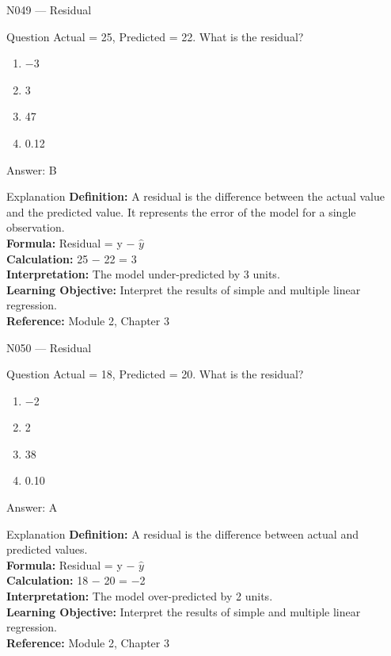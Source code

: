 \documentclass[aspectratio=169,8pt]{beamer}
\begin{document}
	\begin{frame}{N049 --- Residual}
		\begin{block}{Question}
			Actual = 25, Predicted = 22. What is the residual?
			\begin{enumerate}
				\item $-$3
				\item 3
				\item 47
				\item 0.12
			\end{enumerate}
		\end{block}
		\begin{exampleblock}{Answer: B}\end{exampleblock}
		\begin{block}{Explanation}
			\textbf{Definition:} A residual is the difference between the actual value and the predicted value. It represents the error of the model for a single observation.\\
			\textbf{Formula:} Residual = y $-$ $\hat{y}$\\
			\textbf{Calculation:} 25 $-$ 22 = 3\\
			\textbf{Interpretation:} The model under-predicted by 3 units.\\
			\textbf{Learning Objective:} Interpret the results of simple and multiple linear regression.\\
			\textbf{Reference:} Module 2, Chapter 3
		\end{block}
	\end{frame}
	
	\begin{frame}{N050 --- Residual}
		\begin{block}{Question}
			Actual = 18, Predicted = 20. What is the residual?
			\begin{enumerate}
				\item $-$2
				\item 2
				\item 38
				\item 0.10
			\end{enumerate}
		\end{block}
		\begin{exampleblock}{Answer: A}\end{exampleblock}
		\begin{block}{Explanation}
			\textbf{Definition:} A residual is the difference between actual and predicted values.\\
			\textbf{Formula:} Residual = y $-$ $\hat{y}$\\
			\textbf{Calculation:} 18 $-$ 20 = $-$2\\
			\textbf{Interpretation:} The model over-predicted by 2 units.\\
			\textbf{Learning Objective:} Interpret the results of simple and multiple linear regression.\\
			\textbf{Reference:} Module 2, Chapter 3
		\end{block}
	\end{frame}
	
\end{document}

